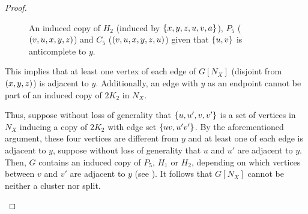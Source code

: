 \begin{proof}
\begin{enumerate}[label=(\roman*)]
\begin{figure}[htb!]
                \caption{An induced copy of $H_2$ (induced by
                    $\left\{x,y,z,u,v,a\right\}$), $P_5$ ($\left(v,u,x,y,z\right)$) and $C_5$
                    ($\left(v,u,x,y,z,u\right)$) given that $\left\{u,v\right\}$ is anticomplete to
                    $y$.}
                \label{fig:type_7_2}
            \end{figure}

            \noindent
            This implies that at least one vertex of each edge of $G[N_X]$
            (disjoint from $\left(x,y,z\right)$) is adjacent to $y$. Additionally, an
            edge with $y$ as an endpoint cannot be part of an induced copy of
            $2K_2$ in $N_X$. 
            
            Thus, suppose without loss of generality that $\left\{u,u',v,v'\right\}$ is a
            set of vertices in $N_X$ inducing a copy of $2K_2$ with edge set
            $\left\{uv,u'v'\right\}$. By the aforementioned argument, these four vertices
            are different from $y$ and at least one of each edge is adjacent to
            $y$, suppose without loss of generality that $u$ and $u'$ are
            adjacent to $y$. Then, $G$ contains an induced copy of $P_5$, $H_1$
            or $H_2$, depending on which vertices between $v$ and $v'$ are
            adjacent to $y$ (see ). It follows that $G[N_X]$
            cannot be neither a cluster nor split.

            \begin{figure}[htb!]
                \centering
                \begin{tikzpicture}[every node/.style={vertex}, 
                    node distance=1cm, on grid, edge]


\end{tikzpicture}
\end{figure}
\end{enumerate}
\end{proof}
